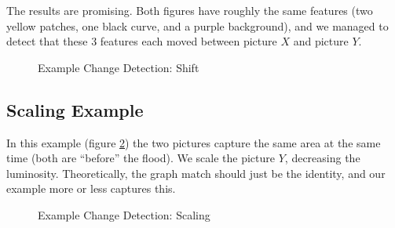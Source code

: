\documentclass[12pt]{article}
\begin{document}
The results are promising. Both figures have roughly the same features (two yellow patches, one black curve, and a purple background), and we managed to detect that these 3 features each moved between picture $X$ and picture $Y$.
\begin{figure}
  \caption{Example Change Detection: Shift}
  \label{fig:shift}
\end{figure}

\subsection{Scaling Example}

In this example (figure \ref{fig:scaling}) the two pictures capture the same area at the same time (both are ``before'' the flood). We scale the picture $Y$, decreasing the luminosity. Theoretically, the graph match should just be the identity, and our example more or less captures this.

\begin{figure}
  \caption{Example Change Detection: Scaling}
  \label{fig:scaling}
\end{figure}
\end{document}
